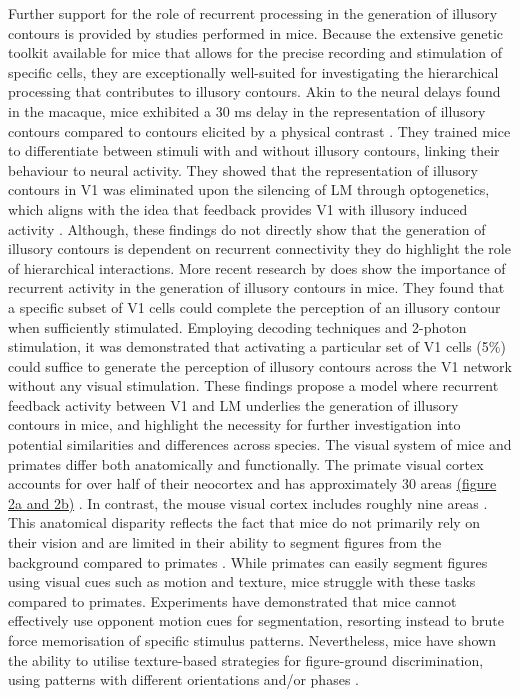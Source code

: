 \documentclass[12pt]{article}
\begin{document}
Further support for the role of recurrent processing in the generation of illusory contours is provided by studies performed in mice. Because the extensive genetic toolkit available for mice that allows for the precise recording and stimulation of specific cells, they are exceptionally well-suited for investigating the hierarchical processing that contributes to illusory contours. Akin to the neural delays found in the macaque, mice exhibited a 30 ms delay in the representation of illusory contours compared to contours elicited by a physical contrast \autocite{pakTopDownFeedbackControls2020}. They trained mice to differentiate between stimuli with and without illusory contours, linking their behaviour to neural activity. They showed that the representation of illusory contours in V1 was eliminated upon the silencing of LM through optogenetics, which aligns with the idea that feedback provides V1 with illusory induced activity \autocite{wyatteEarlyRecurrentFeedback2014}. Although, these findings do not directly show that the generation of illusory contours is dependent on recurrent connectivity they do highlight the role of hierarchical interactions. More recent research by \textcite{shinRecurrentPatternCompletion2023} does show the importance of recurrent activity in the generation of illusory contours in mice. They found that a specific subset of V1 cells could complete the perception of an illusory contour when sufficiently stimulated. Employing decoding techniques and 2-photon stimulation, it was demonstrated that activating a particular set of V1 cells (5\%) could suffice to generate the perception of illusory contours across the V1 network without any visual stimulation. These findings propose a model where recurrent feedback activity between V1 and LM underlies the generation of illusory contours in mice, and highlight the necessity for further investigation into potential similarities and differences across species.
\bigbreak
The visual system of mice and primates differ both anatomically and functionally. The primate visual cortex accounts for over half of their neocortex and has approximately 30 areas \hyperref[fig:Laminar_Figure]{(figure 2a and 2b)} \autocite{fellemanDistributedHierarchicalProcessing1991}. In contrast, the mouse visual cortex includes roughly nine areas \autocite{wangAreaMapMouse2007}. This anatomical disparity reflects the fact that mice do not primarily rely on their vision and are limited in their ability to segment figures from the background compared to primates \autocite{luongoMicePrimatesUse2023}. While primates can easily segment figures using visual cues such as motion and texture, mice struggle with these tasks compared to primates. Experiments have demonstrated that mice cannot effectively use opponent motion cues for segmentation, resorting instead to brute force memorisation of specific stimulus patterns. Nevertheless, mice have shown the ability to utilise texture-based strategies for figure-ground discrimination, using patterns with different orientations and/or phases \autocite{kirchbergerEssentialRoleFeedback2020}. 
\end{document}
